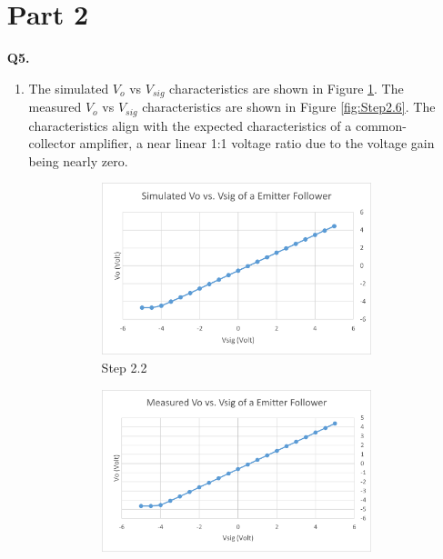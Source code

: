 \documentclass[12pt]{article}
\begin{document}
\begin{itemize}
    \section*{Part 2}
    \item [\textbf{Q5.}]
    \begin{enumerate}
        \item The simulated $V_o$ vs $V_{sig}$ characteristics are shown in Figure \ref{fig:Step2.2}. The measured $V_o$ vs $V_{sig}$ characteristics are shown in Figure \ref{fig:Step2.6}. The characteristics align with the expected characteristics of a common-collector amplifier, a near linear 1:1 voltage ratio due to the voltage gain being nearly zero.
        \begin{figure}[!ht]
            \centering
            \begin{subfigure}[b]{0.45\textwidth}
                \centering
                \includegraphics[width=\textwidth]{Step2.2}
                \caption{Step 2.2}
                \label{fig:Step2.2}
            \end{subfigure}
            \begin{subfigure}[b]{0.48\textwidth}
                \centering
                \includegraphics[width=\textwidth]{Step2.6}

\end{subfigure}
\end{figure}
\end{enumerate}
\end{itemize}
\end{document}
